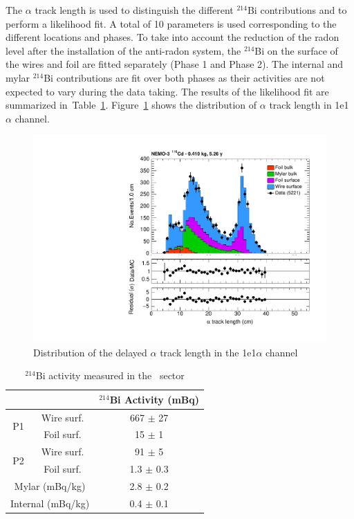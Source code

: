 \documentclass[main.tex]{subfiles}
\begin{document}
\bigskip


\NI The $\alpha$ track length is used to distinguish the different $^{\text{214}}$Bi contributions and to perform a likelihood fit. A total of 10 parameters is used corresponding to the different locations and phases. To take into account the reduction of the radon level after the installation of the anti-radon system, the $^{\text{214}}$Bi on the surface of the wires and foil are fitted separately (Phase 1 and Phase 2). The internal and mylar $^{\text{214}}$Bi contributions are fit over both phases as their activities are not expected to vary during the data taking. The results of the likelihood fit are summarized in~Table~\ref{Table1e1a-activityMeasurement}. Figure~\ref{1e1aChannel_alpphaLength} shows the distribution of $\alpha$ track length in 1e1$\alpha$ channel.


\begin{figure}[h!]
\centering
\includegraphics[page=1,scale=0.55]{pictures/Chap6/FinalPlots.pdf}
\caption{Distribution of the delayed $\alpha$ track length in the 1e1$\alpha$ channel}
\label{1e1aChannel_alpphaLength}
\end{figure}





\begin{table}
\centering
\begin{tabular}{cc|c}
                    &            &  $^{\text{214}}$Bi Activity (mBq) \\
\toprule
\multirow{2}{*}{P1} & Wire surf. & 667 $\pm$ 27 \\ 
                    & Foil surf. & 15 $\pm$ 1 \\
\hline
\multirow{2}{*}{P2} & Wire surf. & 91 $\pm$ 5 \\ 
                    & Foil surf. & 1.3 $\pm$ 0.3 \\
\hline
\multicolumn{2}{c|}{Mylar (mBq/kg)}  & 2.8 $\pm$ 0.2 \\
\hline
\multicolumn{2}{c|}{Internal (mBq/kg)}  & 0.4 $\pm$ 0.1 \\
\bottomrule
\end{tabular}
\caption{$^{\text{214}}$Bi  activity measured in the \Cd~sector}
\label{Table1e1a-activityMeasurement}
\end{table}
\end{document}

